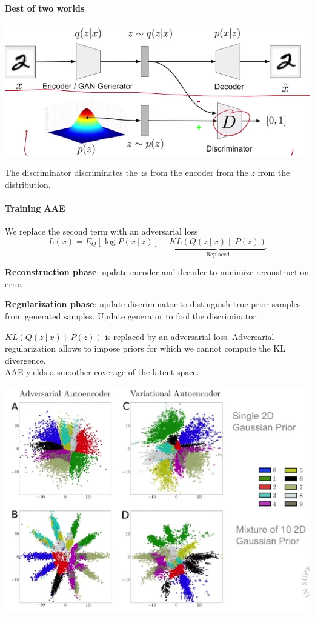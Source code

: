 \documentclass[10pt]{report}
\begin{document}
\paragraph{Best of two worlds}
\begin{center}
	\includegraphics[scale=0.5]{153.png}
\end{center}
The discriminator discriminates the $z$s from the encoder from the $z$ from the distribution.
\paragraph{Training AAE} We replace the second term with an adversarial loss
$$L(x) = E_Q[\log P(x\:|\:z)]-\underset{\text{Replaced}}{\underbrace{KL(Q(z\:|\:x)\|P(z))}}$$
\begin{list}{}{}
	\item \textbf{Reconstruction phase}: update encoder and decoder to minimize reconstruction error
	\item \textbf{Regularization phase}: update discriminator to distinguish true prior samples from generated samples. Update generator to fool the discriminator.
\end{list}
$KL(Q(z\:|\:x)\|P(z))$ is replaced by an adversarial loss. Adversarial regularization allows to impose priors for which we cannot compute the KL divergence.\\
AAE yields a smoother coverage of the latent space.
\begin{center}
	\includegraphics[scale=0.5]{154.png}
\end{center}
\end{document}
